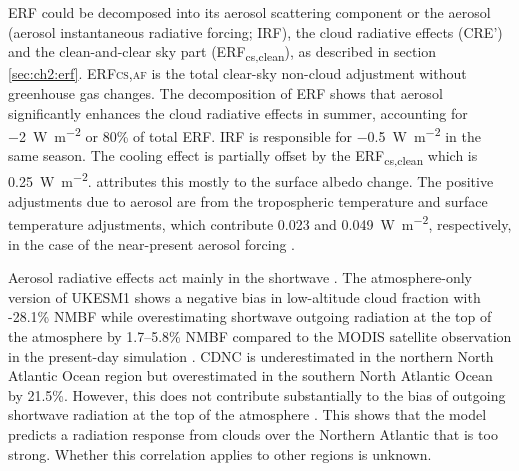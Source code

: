 ERF could be decomposed into its aerosol scattering component or the aerosol (aerosol instantaneous radiative forcing; IRF), the cloud radiative effects (CRE') and the clean-and-clear sky part (ERF\textsubscript{cs,clean}), as described in section \ref{sec:ch2:erf}. ERF\textsc{cs,af} is the total clear-sky non-cloud adjustment without greenhouse gas changes. The decomposition of ERF shows that aerosol significantly enhances the cloud radiative effects in summer, accounting for \qty{-2}{W~m^{-2}} or 80\% of total ERF. IRF is responsible for \qty{-0.5}{W~m^{-2}} in the same season. The cooling effect is partially offset by the ERF\textsubscript{cs,clean} which is \qty{0.25}{W~m^{-2}}. \citet{ghanTechnicalNoteEstimating2013} attributes this mostly to the surface albedo change. The positive adjustments due to aerosol are from the tropospheric temperature and surface temperature adjustments, which contribute 0.023 and \qty{0.049}{W~m^{-2}}, respectively, in the case of the near-present aerosol forcing \citep{thornhillEffectiveRadiativeForcing2021}. 


Aerosol radiative effects act mainly in the shortwave \citep{thornhillEffectiveRadiativeForcing2021,grosvenorDecompositionCloudAerosol2020}. The atmosphere-only version of UKESM1 shows a negative bias in low-altitude cloud fraction with -28.1\% NMBF while overestimating shortwave outgoing radiation at the top of the atmosphere by 1.7--5.8\% NMBF compared to the MODIS satellite observation in the present-day simulation \citep{grosvenorDecompositionCloudAerosol2020}. CDNC is underestimated in the northern North Atlantic Ocean region but overestimated in the southern North Atlantic Ocean by 21.5\%. However, this does not contribute substantially to the bias of outgoing shortwave radiation at the top of the atmosphere \citep{grosvenorDecompositionCloudAerosol2020}. This shows that the model predicts a radiation response from clouds over the Northern Atlantic that is too strong. Whether this correlation applies to other regions is unknown.



